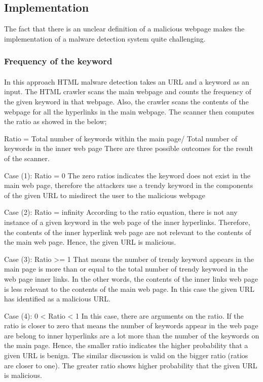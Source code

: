 
\subsection{Implementation}
The fact that there is an unclear definition of a malicious webpage makes the implementation of a malware detection system quite challenging. 	  
	

\subsubsection{Frequency of the keyword}

\paragraph{} 
In this approach HTML malware detection takes an URL and a keyword as an input. The HTML crawler scans the main webpage and counts the frequency of the given keyword in that webpage. Also, the crawler scans the contents of the webpage for all the hyperlinks in the main webpage. The scanner then computes the ratio as showed in the below;

Ratio = Total number of keywords within the main page/ Total number of keywords in the inner web page 
There are three possible outcomes for the result of the scanner. 

Case (1): Ratio = 0
The zero ratios indicates the keyword does not exist in the main web page, therefore the attackers use a trendy keyword in the components of the given URL to misdirect the user to the malicious webpage

Case (2): Ratio = infinity
According to the ratio equation, there is not any instance of a given keyword in the web page of the inner hyperlinks. Therefore, the contents of the inner hyperlink web page are not relevant to the contents of the main web page. Hence, the given URL is malicious.

Case (3): Ratio >= 1
That means the number of trendy keyword appears in the main page is more than or equal to the total number of trendy keyword in the web page inner links. In the other words, the contents of the inner links web page is less relevant to the contents of the main web page. In this case the given URL has identified as a malicious URL. 

Case (4): 0 < Ratio < 1
In this case, there are arguments on the ratio. If the ratio is closer to zero that means the number of keywords appear in the web page are belong to inner hyperlinks are a lot more than the number of the keywords on the main page. Hence, the smaller ratio indicates the higher probability that a given URL is benign. The similar discussion is valid on the bigger ratio (ratios are closer to one). The greater ratio shows higher probability that the given URL is malicious. 

